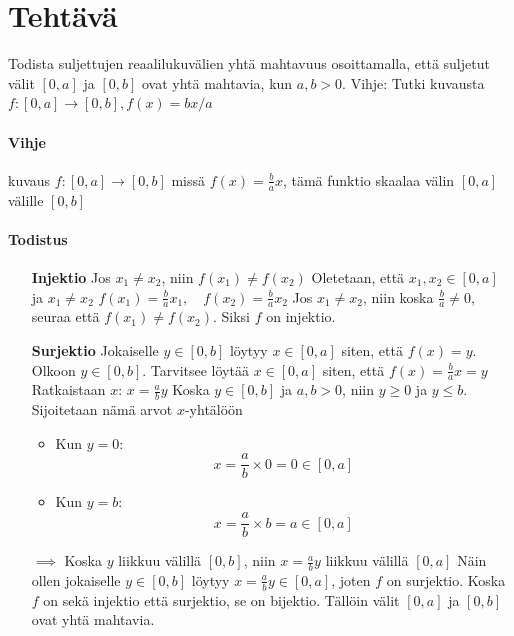 \documentclass{article}
\newcounter{tehtava}
\begin{document}
\newpage
{}
\section*{Tehtävä \thetehtava}
Todista suljettujen reaalilukuvälien yhtä mahtavuus osoittamalla, että suljetut välit $[0, a]$ ja
$[0, b]$ ovat yhtä mahtavia, kun $a, b > 0$. Vihje: Tutki kuvausta $f : [0, a] \rightarrow [0, b], f(x) = bx/a$
\newline
\paragraph*{Vihje}
kuvaus $f : [0, a] \rightarrow [0, b]$ missä $f(x) = \frac{b}{a}x$, tämä funktio skaalaa välin $[0, a]$ välille $[0, b]$

\paragraph*{Todistus}
\begin{itemize}
    \item[\textbf{Injektio}] Jos $x_1 \neq x_2$, niin $f(x_1) \neq f(x_2)$\newline
    Oletetaan, että $x_1, x_2 \in [0, a]$ ja $x_1 \neq x_2$\newline
    $f(x_1) = \frac{b}{a}x_1, \quad f(x_2) = \frac{b}{a}x_2$\newline
    Jos $x_1 \neq x_2$, niin koska $\frac{b}{a} \neq 0$, seuraa että $f(x_1) \neq f(x_2)$. Siksi $f$ on injektio.
    \item[\textbf{Surjektio}] Jokaiselle $y \in [0, b]$ löytyy $x \in [0, a]$ siten, että $f(x) = y$.\newline
    Olkoon $y \in [0, b]$. Tarvitsee löytää $x \in [0, a]$ siten, että\newline
    $f(x) = \frac{b}{a}x = y$\newline
    \newline
    Ratkaistaan $x$:\newline
    $x = \frac{a}{b}y$\newline
    Koska $y \in [0, b]$ ja $a, b > 0$, niin $y \geq 0$ ja $y \leq b$. Sijoitetaan nämä arvot $x$-yhtälöön
    \begin{itemize}
        \item Kun $y = 0$:
        \[
        x = \frac{a}{b} \times 0 = 0 \in [0, a]
        \]
        \item Kun $y = b$:
        \[
        x = \frac{a}{b} \times b = a \in [0, a]
        \]
    \end{itemize}
    $\implies$ Koska $y$ liikkuu välillä $[0, b]$, niin $x = \frac{a}{b}y$ liikkuu välillä $[0, a]$\newline
    Näin ollen jokaiselle  $y \in [0, b]$ löytyy $x = \frac{a}{b}y \in [0, a]$, joten $f$ on surjektio.\newline
    \newline
    Koska $f$ on sekä injektio että surjektio, se on bijektio. Tällöin välit $[0, a]$ ja $[0, b]$ ovat yhtä mahtavia.
\end{itemize}
\end{document}

